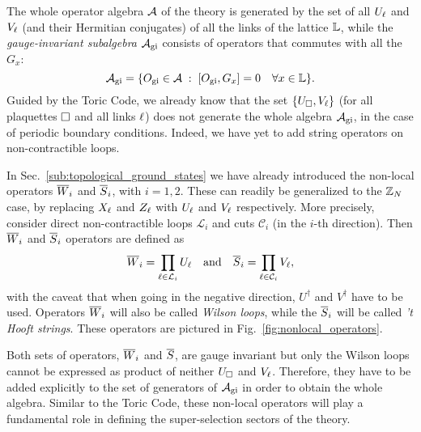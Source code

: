 \begin{figure}[t]
\end{figure}


The whole operator algebra $\mathcal{A}$ of the theory is generated by the set of all $U_\ell$ and $V_\ell$ (and their Hermitian conjugates) of all the links of the lattice $\mathbb{L}$, while the  \emph{gauge-invariant subalgebra} $\mathcal{A}_{\text{gi}}$ consists of operators that commutes with all the $G_x$:
\begin{equation}
    \mathcal{A}_{\text{gi}} = \{ O_{\text{gi}} \in \mathcal{A} \;:\; [O_{\text{gi}}, G_x] = 0 \quad \forall x \in \mathbb{L} \}.
\end{equation}
Guided by the Toric Code, we already know that the set $\{U_{\square}, V_\ell\}$ (for all plaquettes $\square$ and all links $\ell$) does not generate the whole algebra $\mathcal{A}_{\text{gi}}$, in the case of periodic boundary conditions.
Indeed, we have yet to add string operators on non-contractible loops.

In Sec.~\ref{sub:topological_ground_states} we have already introduced the non-local operators $\overline{W}_{i}$ and $\overline{S}_{i}$, with $i=1,2$.
These can readily be generalized to the $\mathbb{Z}_N$ case, by replacing $X_{\ell}$ and $Z_{\ell}$ with $U_{\ell}$ and $V_{\ell}$ respectively.
More precisely, consider direct non-contractible loops $\mathcal{L}_i$ and cuts $\mathcal{C}_i$ (in the $i$-th direction).
Then $\overline{W}_i$ and $\overline{S}_i$ operators are defined as
\begin{equation}
    \Wilson_i = \prod_{\link \in \mathcal{L}_i} U_\link
    \qand
    \tHooft_i = \prod_{\link \in \mathcal{C}_i} V_\link,
    \label{eq:nonlocal_op_ZN}
\end{equation}
with the caveat that when going in the negative direction, $U^{\dagger}$ and $V^{\dagger}$ have to be used.
Operators $\overline{W}_i$ will also be called \emph{Wilson loops}, while the $\overline{S}_i$ will be called \emph{'t Hooft strings}.
These operators are pictured in Fig.~\ref{fig:nonlocal_operators}.

Both sets of operators, $\overline{W}_i$ and $\overline{S}$, are gauge invariant but only the Wilson loops cannot be expressed as product of neither $U_{\square}$ and $V_{\ell}$.
Therefore, they have to be added explicitly to the set of generators of $\mathcal{A}_{\text{gi}}$ in order to obtain the whole algebra.
Similar to the Toric Code, these non-local operators will play a fundamental role in defining the super-selection sectors of the theory.

